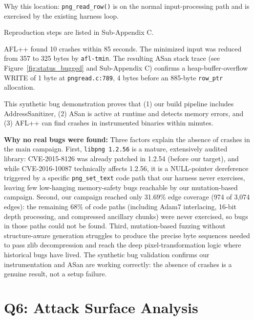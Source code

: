 \documentclass[letterpaper,twocolumn,10pt]{article}
\begin{document}
Why this location: \texttt{png\_read\_row()} is on the normal input-processing
path and is exercised by the existing harness loop.

Reproduction steps are listed in Sub-Appendix C\@.

AFL++ found 10 crashes within 85 seconds. The minimized input was reduced from
357 to 325 bytes by \texttt{afl-tmin}. The resulting ASan stack trace (see
Figure~\ref{fig:status_bugged} and Sub-Appendix C) confirms a heap-buffer-overflow WRITE of 1 byte at
\texttt{pngread.c:789}, 4 bytes before an 885-byte \texttt{row\_ptr} allocation.

This synthetic bug demonstration proves that (1) our build pipeline includes
AddressSanitizer, (2) ASan is active at runtime and detects memory errors, and
(3) AFL++ can find crashes in instrumented binaries within minutes.

\textbf{Why no real bugs were found:} Three factors explain the absence of crashes
in the main campaign. First, \texttt{libpng 1.2.56} is a mature, extensively
audited library: CVE-2015-8126 was already patched in 1.2.54 (before our
target), and while CVE-2016-10087 technically affects 1.2.56, it is a
NULL-pointer dereference triggered by a specific \texttt{png\_set\_text}
code path that our harness never exercises, leaving few low-hanging
memory-safety bugs reachable by our mutation-based campaign. Second, our
campaign reached only 31.69\% edge coverage (974 of 3,074 edges): the remaining
68\% of code paths (including Adam7 interlacing, 16-bit depth processing, and
compressed ancillary chunks) were never exercised, so bugs in those paths could
not be found. Third, mutation-based fuzzing without structure-aware generation
struggles to produce the precise byte sequences needed to pass zlib decompression
and reach the deep pixel-transformation logic where historical bugs have lived.
The synthetic bug validation confirms our instrumentation and ASan are working
correctly: the absence of crashes is a genuine result, not a setup failure.


\section{Q6: Attack Surface Analysis}
\end{document}
